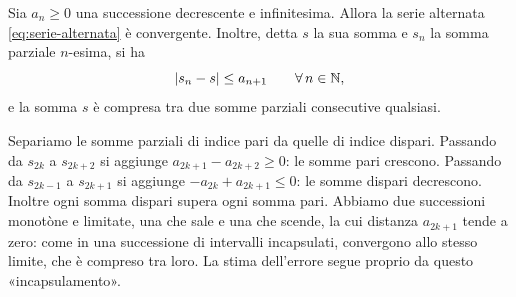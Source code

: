 \begin{teorema}\label{teo:leibniz}
Sia $a_{n}\ge0$ una successione decrescente e infinitesima. Allora la serie alternata
\eqref{eq:serie-alternata} è convergente. Inoltre, detta $s$ la sua somma e $s_{n}$ la
somma parziale $n$-esima, si ha
\begin{equation}\label{eq:stima-leibniz}
  \lvert s_{n}-s\rvert\le a_{n+1} \qquad\forall\, n\in\mathbb{N} ,
\end{equation}
e la somma $s$ è compresa tra due somme parziali consecutive qualsiasi.
\end{teorema}

\begin{schema}
\end{schema}

\begin{strategia}
Separiamo le somme parziali di indice pari da quelle di indice dispari. Passando da
$s_{2k}$ a $s_{2k+2}$ si aggiunge $a_{2k+1}-a_{2k+2}\ge0$: le somme pari crescono. Passando da
$s_{2k-1}$ a $s_{2k+1}$ si aggiunge $-a_{2k}+a_{2k+1}\le0$: le somme dispari decrescono. Inoltre
ogni somma dispari supera ogni somma pari. Abbiamo due successioni monotòne e
limitate, una che sale e una che scende, la cui distanza $a_{2k+1}$ tende a zero: come in una
successione di intervalli incapsulati, convergono allo stesso limite, che è compreso tra
loro. La stima dell'errore segue proprio da questo «incapsulamento».
\end{strategia}

